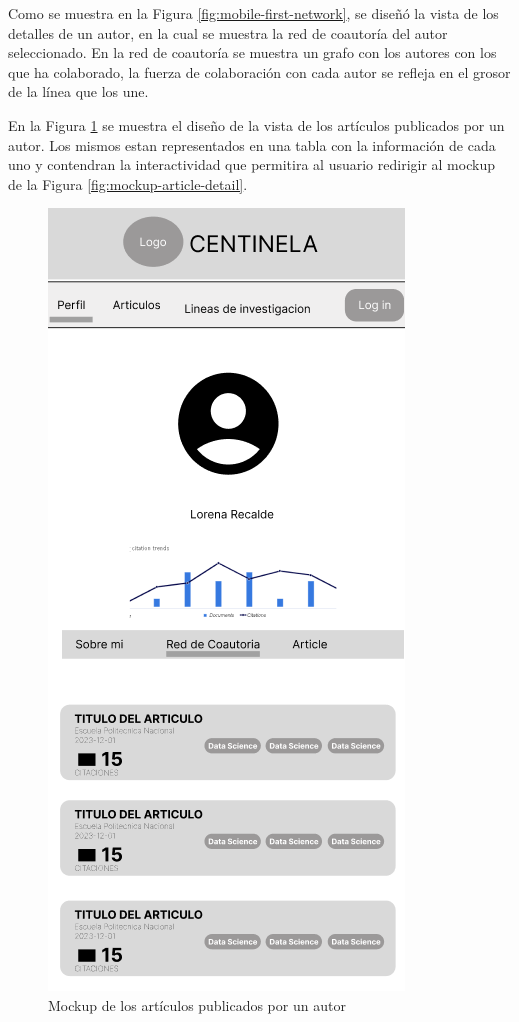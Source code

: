 Como se muestra en la Figura \ref{fig:mobile-first-network}, se diseñó la vista de los detalles de un autor, en la cual se muestra la red de coautoría del autor seleccionado. 
En la red de coautoría se muestra un grafo con los autores con los que ha colaborado, la fuerza de colaboración con cada autor se refleja en el grosor de la línea que los une.

En la Figura \ref{fig:mobile-first-articles} se muestra el diseño de la vista de los artículos publicados por un autor.
Los mismos estan representados en una tabla con la información de cada uno y contendran la interactividad que permitira al usuario redirigir al mockup de la Figura \ref{fig:mockup-article-detail}.

\begin{figure}[H]
    \centering
    \includegraphics[scale=0.5]{../02Figures/02Chapter/Sprints/Sprint-2/mobile-first-articles.png}
    \caption{Mockup de los artículos publicados por un autor}
    \label{fig:mobile-first-articles}
\end{figure}


